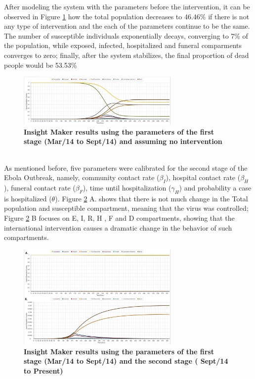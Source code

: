 \documentclass[10pt]{article}
\begin{document}
%
\noindent After modeling the system with the parameters before the intervention, it can be observed in Figure \ref{fig:LB_IM_NoIn} how the total population decreases to 46.46\%  if there is not any type of intervention and the each of the parameters continue to be the same. The number of susceptible individuals exponentially decays, converging to 7\% of the population, while exposed, infected, hospitalized and funeral comparments converges to zero; finally, after the system stabilizes, the final proportion of dead people would be 53.53\% \\

\begin{figure}[!h]
  \centering
  \includegraphics[width=0.7\textwidth]{LB_NoInt_SD_IM}
  \caption{ \bf Insight Maker results using the parameters of the first stage (Mar/14 to Sept/14) and assuming no intervention}
\label{fig:LB_IM_NoIn} 
\end{figure}\\

\noindent As mentioned before, five parameters were calibrated for the second stage of the Ebola Outbreak, namely, community contact rate ($\beta_I$), hospital contact rate ($\beta_H$), funeral contact rate ($\beta_F$), time until hospitalization ($\gamma_H$) and probability a case is hospitalized ($\theta$). Figure \ref{fig:LB_IM_In} A. shows that there is not much change in the Total population and susceptible compartment, meaning that the virus was controlled;  Figure \ref{fig:LB_IM_In} B focuses on E, I, R, H , F and D compartments, showing that the international intervention causes a dramatic change in the behavior of such compartments.\\

\begin{figure}[!h]
  \centering
  \includegraphics[width=0.7\textwidth]{LB_Int3_SD_IM}
  \caption{ \bf Insight Maker results using the parameters of the first stage (Mar/14 to Sept/14) and the second stage ( Sept/14 to Present)}
\label{fig:LB_IM_In} 
\end{figure}\\
\end{document}
